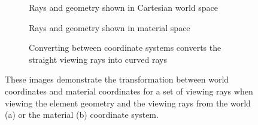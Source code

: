 \begin{figure}
\centering
\begin{subfigure}[b]{0.3\textwidth}
    \caption{Rays and geometry shown in Cartesian world space}
    \label{contributions:fem:rays:world}
\end{subfigure}
\hfill
\begin{subfigure}[b]{0.3\textwidth}
    \caption{Rays and geometry shown in material space}
    \label{contributions:fem:rays:xi}
\end{subfigure}
\hfill
\begin{subfigure}[b]{0.3\textwidth}
   \caption{Converting between coordinate systems converts the straight viewing rays into curved rays}
   \label{contributions:fem:rays:rays}
\end{subfigure}
\caption{These images demonstrate the transformation between world coordinates and material coordinates for a set of viewing rays when viewing the element geometry and the viewing rays from the world (a) or the material (b) coordinate system.}
\label{contributions:fem:rays}
\end{figure}

